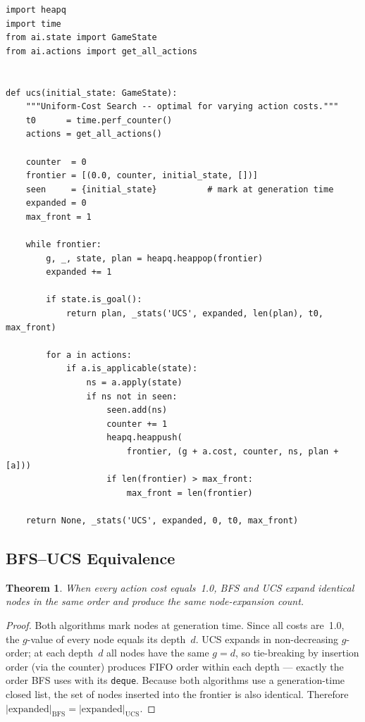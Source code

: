 \documentclass[12pt, a4paper]{report}
\newtheorem{theorem}{Theorem}[chapter]
\begin{document}
\begin{lstlisting}[style=pyStyle,
  caption={UCS implementation (\texttt{ai/algorithms/ucs.py}).},
  label=lst:ucs]
import heapq
import time
from ai.state import GameState
from ai.actions import get_all_actions


def ucs(initial_state: GameState):
    """Uniform-Cost Search -- optimal for varying action costs."""
    t0      = time.perf_counter()
    actions = get_all_actions()

    counter  = 0
    frontier = [(0.0, counter, initial_state, [])]
    seen     = {initial_state}          # mark at generation time
    expanded = 0
    max_front = 1

    while frontier:
        g, _, state, plan = heapq.heappop(frontier)
        expanded += 1

        if state.is_goal():
            return plan, _stats('UCS', expanded, len(plan), t0, max_front)

        for a in actions:
            if a.is_applicable(state):
                ns = a.apply(state)
                if ns not in seen:
                    seen.add(ns)
                    counter += 1
                    heapq.heappush(
                        frontier, (g + a.cost, counter, ns, plan + [a]))
                    if len(frontier) > max_front:
                        max_front = len(frontier)

    return None, _stats('UCS', expanded, 0, t0, max_front)
\end{lstlisting}

\subsection{BFS--UCS Equivalence}
\label{sec:equivalence}

\begin{theorem}
When every action cost equals~1.0, BFS and UCS expand identical nodes in the
same order and produce the same node-expansion count.
\end{theorem}

\begin{proof}
Both algorithms mark nodes at generation time.  Since all costs are~1.0, the
$g$-value of every node equals its depth~$d$.  UCS expands in non-decreasing
$g$-order; at each depth~$d$ all nodes have the same $g = d$, so tie-breaking
by insertion order (via the counter) produces FIFO order within each depth ---
exactly the order BFS uses with its \texttt{deque}.  Because both algorithms
use a generation-time closed list, the set of nodes inserted into the frontier
is also identical.  Therefore
$|\text{expanded}|_{\text{BFS}} = |\text{expanded}|_{\text{UCS}}$.
\end{proof}
\end{document}
